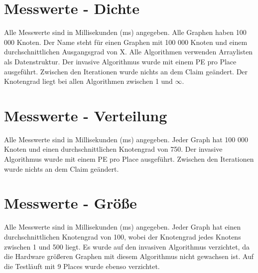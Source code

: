 

\clearpage
\appendix
{}

\section{Messwerte - Dichte}
\label{Anhang-Messwerte-Dichte}
Alle Messwerte sind in Millisekunden (ms) angegeben. Alle Graphen haben 100 000 Knoten. Der Name  steht für einen Graphen mit 100 000 Knoten und einem durchschnittlichen Ausgangsgrad von X. Alle Algorithmen verwenden Arraylisten als Datenstruktur. Der invasive Algorithmus wurde mit einem PE pro Place ausgeführt. Zwischen den Iterationen wurde nichts an dem Claim geändert. Der Knotengrad liegt bei allen Algorithmen zwischen 1 und $\infty$.
 

\clearpage
\section{Messwerte - Verteilung}
\label{Anhang-Messwerte-Verteilung}
Alle Messwerte sind in Millisekunden (ms) angegeben. Jeder Graph hat 100 000 Knoten und einen durchschnittlichen Knotengrad von 750. Der invasive Algorithmus wurde mit einem PE pro Place ausgeführt. Zwischen den Iterationen wurde nichts an dem Claim geändert.


\section{Messwerte - Größe}
\label{Anhang-Messwerte-Groesse}
Alle Messwerte sind in Millisekunden (ms) angegeben. Jeder Graph hat einen durchschnittlichen Knotengrad von 100, wobei der Knotengrad jedes Knotens zwischen 1 und 500 liegt. Es wurde auf den invasiven Algorithmus verzichtet, da die Hardware größeren Graphen mit diesem Algorithmus nicht gewachsen ist. Auf die Testläuft mit 9 Places wurde ebenso verzichtet.


		
